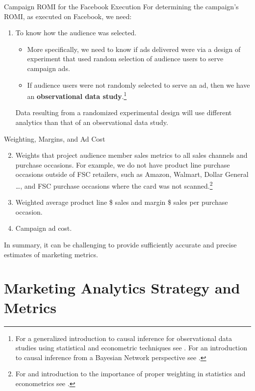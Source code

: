 \documentclass[pdf]{beamer}
\newcommand{\empr}[1]{{\color{franklinblue}\textbf{#1}}}
\theoremstyle{remark}
\theoremstyle{definition}
\begin{document}
\begin{frame}[t]{Campaign ROMI for the Facebook Execution}
For determining the campaign's ROMI, as executed on Facebook, we need:\\
\vspace{1.5ex}
\begin{enumerate}
 \item To know how the audience was selected.  
 \begin{itemize}
  \item More specifically, we need to know if ads delivered were via a design of experiment that used random selection of audience users to serve campaign ads. 
  \item If audience users were not randomly selected to serve an ad, then we have an \empr{observational data study}.\footnote{For a generalized introduction to causal inference for observational data studies using statistical and econometric techniques see \cite{imbens2015}. For an introduction to causal inference from a Bayesian Network perspective see \cite{pearl2018}.}
 \end{itemize}
 \vspace{0.0ex}
 Data resulting from a randomized experimental design will use different analytics than that of an observational data study.
\end{enumerate}
\end{frame}

\begin{frame}[t]{Weighting, Margins, and Ad Cost}
\begin{enumerate}
\setcounter{enumi}{1}
 \item Weights that project audience member sales metrics to all sales channels and purchase occasions. For example, we do not have product line purchase occasions outside of FSC retailers, such as Amazon, Walmart, Dollar General \ldots, and FSC purchase occasions where the card was not scanned.\footnote{For and introduction to the importance of proper weighting in statistics and econometrics see \cite{solon2015}.}
 \item Weighted average product line \$ sales and margin \$ sales per purchase occasion. 
 \item Campaign ad cost.  
\end{enumerate}
In summary, it can be challenging to provide sufficiently accurate and precise estimates of marketing metrics. 
\end{frame}

\section{Marketing Analytics Strategy and Metrics}
\end{document}
